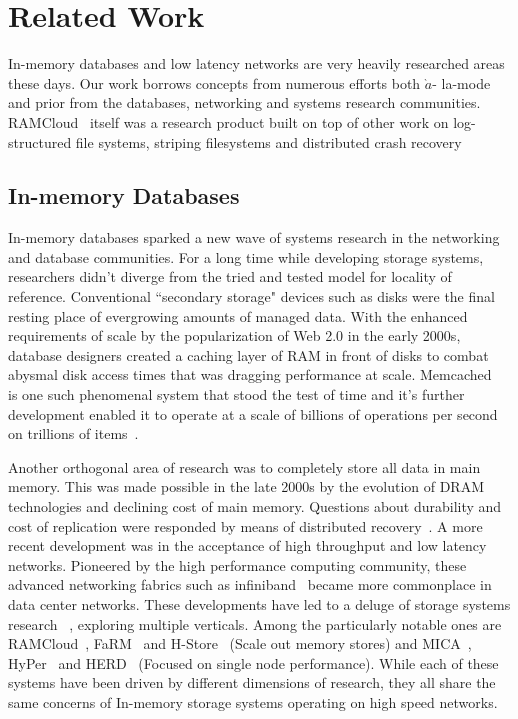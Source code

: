 
\chapter{Related Work}
\label{chap:relatedwork}

In-memory databases and low latency networks are very heavily researched areas
these days. Our work borrows concepts from numerous efforts both $\grave{a}$-
la-mode and prior from the databases, networking and systems research communities.
RAMCloud~\cite{ramcloud} itself was a research product built on top of other 
work on log-structured file systems, striping filesystems and distributed 
crash recovery~\cite{ryan-thesis,ongaro2011fast}

\section{In-memory Databases}
In-memory databases sparked a new wave of systems research in the 
networking and database communities. For a long time while developing storage
systems, researchers didn't diverge from the  tried and tested model for
locality of reference. Conventional ``secondary storage" devices
such as disks were the final resting place of evergrowing amounts of managed data. With the 
enhanced requirements of scale by the popularization of Web 2.0 in the early 2000s, 
database designers created a caching layer of RAM in front of disks
to combat abysmal disk access times that was dragging performance at scale. Memcached~\cite{memcached-orig}
is one such phenomenal system that stood the test of time and it's further development
enabled it to operate at a scale of billions of operations per second on trillions of items~\cite{nishtala2013scaling}.

Another orthogonal area of research was to completely store all data in main memory.
This was made possible in the late 2000s by the evolution of DRAM technologies and declining cost of main memory.
Questions about durability and cost of replication 
were responded by means of distributed recovery~\cite{ongaro2011fast}. 
A more recent development was in the acceptance of high throughput and low latency networks. 
Pioneered by the high performance computing community, these advanced networking fabrics 
such as infiniband~\cite{pfister2001introduction} became more commonplace in 
data center networks. These developments have led to a deluge of storage systems research~\cite{mmdbmstutorial} ,
exploring multiple verticals. Among the particularly notable ones are RAMCloud~\cite{ramcloud},
FaRM~\cite{farm} and H-Store~\cite{hstore} (Scale out memory stores) and
MICA~\cite{mica}, HyPer~\cite{hyper} and HERD~\cite{herd} (Focused on single node performance).
While each of these systems have been driven by different dimensions 
of research, they all share the same concerns of In-memory storage systems 
operating on high speed networks.

